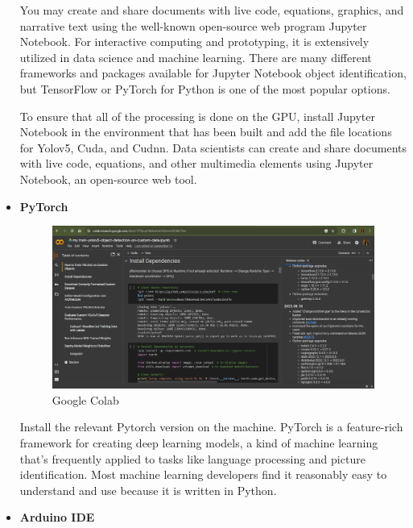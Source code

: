 \documentclass[12pt,a4paper]{report}
\begin{document}
\begin{itemize}
\par You may create and share documents with live code, equations, graphics, and narrative text using the well-known open-source web program Jupyter Notebook. For interactive computing and prototyping, it is extensively utilized in data science and machine learning. There are many different frameworks and packages available for Jupyter Notebook object identification, but TensorFlow or PyTorch for Python is one of the most popular options.




\par To ensure that all of the processing is done on the GPU, install Jupyter Notebook in the environment that has been built and add the file locations for Yolov5, Cuda, and Cudnn. Data scientists can create and share documents with live code, equations, and other multimedia elements using Jupyter Notebook, an open-source web tool.



\item {\bf{PyTorch }}


\begin{figure}[!htb]
\begin{center}
\includegraphics[scale=0.3]{images/platform_SS/Screenshot (5).png}
\caption{Google Colab }
\end{center}
\end{figure}


\par Install the relevant Pytorch version on the machine. PyTorch is a feature-rich framework for creating deep learning models, a kind of machine learning that's frequently applied to tasks like language processing and picture identification. Most machine learning developers find it reasonably easy to understand and use because it is written in Python. 

\item {\bf{Arduino IDE }}


\end{itemize}
\end{document}
